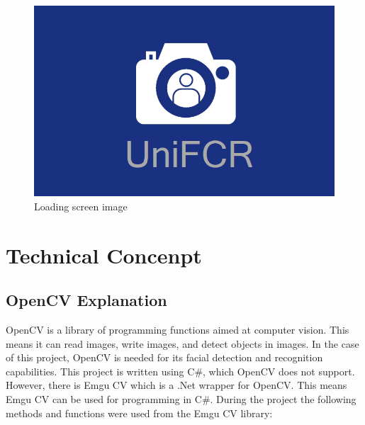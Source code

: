 \documentclass[12pt, a4paper]{article}
\begin{document}
\begin{figure}[htb]
	\centering
		\includegraphics[width=1.0\columnwidth]{images/load}
	\caption{Loading screen image}
	\label{fig:load}
\end{figure}



\newpage



\section{Technical Concenpt}
\subsection{OpenCV Explanation}
OpenCV is a library of programming functions aimed at computer vision. This means it can read images, write images, and detect objects in images. In the case of this project, OpenCV is needed for its facial detection and recognition capabilities. This project is written using C\#, which OpenCV does not support. However, there is Emgu CV which is a .Net wrapper for OpenCV. This means Emgu CV can be used for programming in C\#. During the project the following methods and functions were used from the Emgu CV library:
\end{document}
